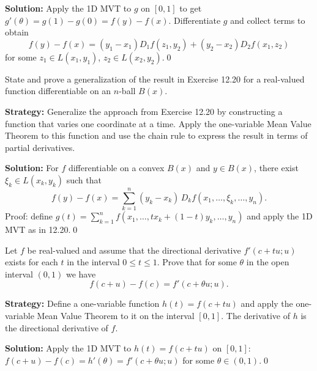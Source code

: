 \bigskip\noindent\textbf{Solution:}
Apply the 1D MVT to $g$ on $[0,1]$ to get $g'(\theta)=g(1)-g(0)=f(y)-f(x)$. Differentiate $g$ and collect terms to obtain
\[f(y)-f(x)=(y_1-x_1)D_1 f(z_1,y_2)+(y_2-x_2)D_2 f(x_1,z_2)\]
for some $z_1\in L(x_1,y_1)$, $z_2\in L(x_2,y_2)$.\qed


\begin{problembox}
\begin{problemstatement}
State and prove a generalization of the result in Exercise 12.20 for a real-valued function differentiable on an \( n \)-ball \( B(x) \).
\end{problemstatement}
\end{problembox}

\noindent\textbf{Strategy:} Generalize the approach from Exercise 12.20 by constructing a function that varies one coordinate at a time. Apply the one-variable Mean Value Theorem to this function and use the chain rule to express the result in terms of partial derivatives.

\bigskip\noindent\textbf{Solution:}
For $f$ differentiable on a convex $B(x)$ and $y\in B(x)$, there exist $\xi_k\in L(x_k,y_k)$ such that
\[f(y)-f(x)=\sum_{k=1}^n (y_k-x_k)\,D_k f(x_1,\dots,\xi_k,\dots,y_n).\]
Proof: define $g(t)=\sum_{k=1}^n f(x_1,\dots,tx_k+(1-t)y_k,\dots,y_n)$ and apply the 1D MVT as in 12.20.\qed


\begin{problembox}
\begin{problemstatement}
Let \( f \) be real-valued and assume that the directional derivative \( f'(c + tu; u) \) exists for each \( t \) in the interval \( 0 \leq t \leq 1 \). Prove that for some \( \theta \) in the open interval \( (0, 1) \) we have
\[f(c + u) - f(c) = f'(c + \theta u; u).\]
\end{problemstatement}
\end{problembox}

\noindent\textbf{Strategy:} Define a one-variable function \( h(t) = f(c + tu) \) and apply the one-variable Mean Value Theorem to it on the interval \( [0,1] \). The derivative of \( h \) is the directional derivative of \( f \).

\bigskip\noindent\textbf{Solution:}
Apply the 1D MVT to $h(t)=f(c+tu)$ on $[0,1]$: $f(c+u)-f(c)=h'(\theta)=f'(c+\theta u;u)$ for some $\theta\in(0,1)$.\qed



